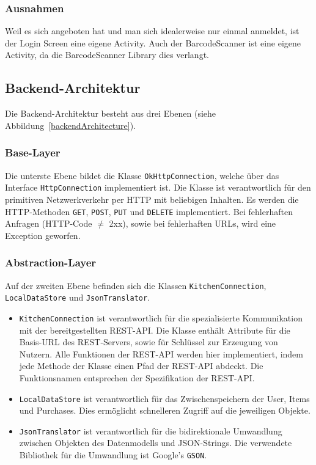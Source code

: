 \subsubsection{Ausnahmen}

Weil es sich angeboten hat und man sich idealerweise nur einmal anmeldet, ist der Login Screen eine eigene Activity.
Auch der BarcodeScanner ist eine eigene Activity, da die BarcodeScanner Library dies verlangt.

\subsection{Backend-Architektur}\label{subsec:backend}

Die Backend-Architektur besteht aus drei Ebenen (siehe Abbildung~\ref{backendArchitecture}).

\subsubsection{Base-Layer}

Die unterste Ebene bildet die Klasse \texttt{OkHttpConnection}, welche über das Interface \texttt{HttpConnection} implementiert ist.
Die Klasse ist verantwortlich für den primitiven Netzwerkverkehr per HTTP mit beliebigen Inhalten.
Es werden die HTTP-Methoden \texttt{GET}, \texttt{POST}, \texttt{PUT} und \texttt{DELETE} implementiert.
Bei fehlerhaften Anfragen (HTTP-Code $\neq$ 2xx), sowie bei fehlerhaften URLs, wird eine Exception geworfen.

\subsubsection{Abstraction-Layer}

Auf der zweiten Ebene befinden sich die Klassen \texttt{KitchenConnection}, \texttt{LocalDataStore} und \texttt{JsonTranslator}.

\begin{itemize}
	\item  \texttt{KitchenConnection} ist verantwortlich für die spezialisierte Kommunikation mit der bereitgestellten REST-API. Die Klasse enthält Attribute für die Basis-URL des REST-Servers, sowie für Schlüssel zur Erzeugung von Nutzern.
	Alle Funktionen der REST-API werden hier implementiert, indem jede Methode der Klasse einen Pfad der REST-API abdeckt.
	Die Funktionsnamen entsprechen der Spezifikation der REST-API\@.

	\item \texttt{LocalDataStore} ist verantwortlich für das Zwischenspeichern der User, Items und Purchases.
	Dies ermöglicht schnelleren Zugriff auf die jeweiligen Objekte.

	\item \texttt{JsonTranslator} ist verantwortlich für die bidirektionale Umwandlung zwischen Objekten des Datenmodells und JSON-Strings.
	Die verwendete Bibliothek für die Umwandlung ist Google's \texttt{GSON}.
\end{itemize}

